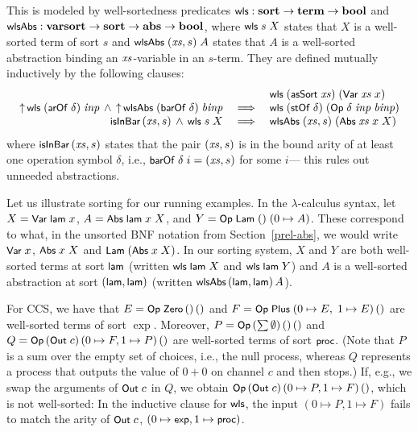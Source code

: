 \documentclass{llncs}
\begin{document}
This is modeled by well-sortedness predicates $\wls: \sort \ra \term \ra \bool$ and 
$\wlsAbs: \varsort \ra \sort \ra \abs \ra \bool$, where $\wls\;s\;X$ 
states that $X$ is a well-sorted term of sort $s$ and $\wlsAbs\;(\xs,s)\;A$ 
states that $A$ is a well-sorted abstraction binding an $\xs$-variable in an $s$-term. 
%
They are defined mutually inductively by the 
following clauses: 
$$\begin{array}{rcl}
&&\wls\;(\asSort\;\xs)\;(\Var\;\xs\;x)
\\
\lift\,\wls\;(\arOf\;\delta)\;\inp \,\wedge\, \lift\,\wlsAbs\;(\barOf\;\delta)\;\binp &\;\LRA\;&
 \wls\;(\stOf\;\delta)\;(\Op\;\delta\;\inp\;\binp)
\\
\isInBar\,(\xs,s) \,\wedge\, \wls\;s\;X &\;\LRA\;& \wlsAbs\;(\xs,s)\;(\Abs\;\xs\;x\;X)
\end{array}
$$
%
where $\isInBar\,(\xs,s)$ states that the pair $(\xs,s)$ is in the bound arity of at 
least one operation symbol $\delta$, i.e., $\barOf\;\delta\;i = (\xs,s)$ for some $i$---
this %
rules out unneeded abstractions. 



%
Let us illustrate sorting for our running examples. 
In the $\lambda$-calculus syntax, 
let $X = \Var\;\lam\;x$, 
$A = \Abs\;\lam\;x\;X$, and 
$Y = \Op\;\Lam\;()\;(0 \mapsto A)$. 
These correspond to what, in the unsorted BNF notation from Section~\ref{prel-abs}, 
we would write $\Var\;x$, $\Abs\;x\;X$ and $\Lam\;(\Abs\;x\;X)$. 
In our sorting system, $X$ and $Y$ are both well-sorted terms at sort $\lam$ 
(written $\wls\;\lam\;X$ and $\wls\;\lam\;Y$) and 
$A$ is a well-sorted abstraction at sort $(\lam,\lam)$ (written $\wlsAbs\,(\lam,\lam)\,A$). 


For CCS, we have that 
$E = \Op\;\Zero\,()\,()$ and 
$F = \Op\;\Plus\;(0\mapsto E,\;1\mapsto E)\,()$ are well-sorted terms of sort $\exp$. 
Moreover, $P = \Op\,(\sum \emptyset)\,()\,()$ and 
$Q = \Op\,(\Out\;c)\,\allowbreak(0\mapsto F,1 \mapsto P)\,()$ are well-sorted terms of sort $\proc$. 
(Note that $P$ is a sum over the empty set of choices, i.e., the null process, whereas 
$Q$ represents a process that outputs the value of $0+0$ on channel $c$ and then stops.)
%
If, e.g., 
we swap the arguments of $\Out\;c$ in $Q$, we obtain 
$\Op\,(\Out\;c)\,(0 \mapsto P,1\mapsto F)\,()$, which is not well-sorted: 
In the inductive clause for $\wls$, the input $(0 \mapsto P,1\mapsto F)$ fails 
to match the arity of $\Out\;c$, %
$(0 \mapsto \exp,1\mapsto \proc)$.  
\end{document}
